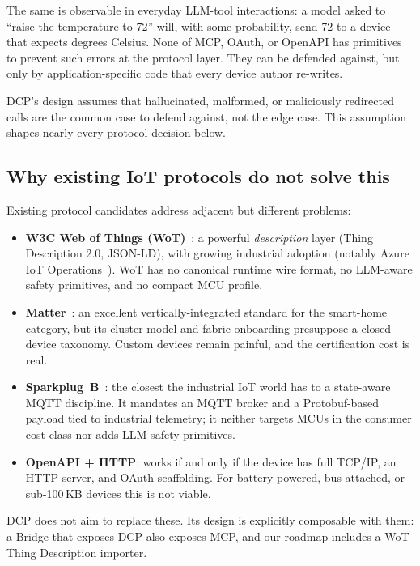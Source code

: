 \documentclass[11pt,a4paper]{article}
\begin{document}
The same is observable in everyday LLM-tool interactions: a model asked to
``raise the temperature to 72'' will, with some probability, send 72 to a
device that expects degrees Celsius. None of MCP, OAuth, or OpenAPI has
primitives to prevent such errors at the protocol layer. They can be
defended against, but only by application-specific code that every device
author re-writes.

DCP's design assumes that hallucinated, malformed, or maliciously
redirected calls are the common case to defend against, not the edge case.
This assumption shapes nearly every protocol decision below.

\subsection{Why existing IoT protocols do not solve this}

Existing protocol candidates address adjacent but different problems:

\begin{itemize}[leftmargin=*,nosep]
  \item \textbf{W3C Web of Things (WoT)}~\cite{wot_td_2025}: a powerful
        \emph{description} layer (Thing Description 2.0, JSON-LD), with
        growing industrial adoption (notably Azure IoT
        Operations~\cite{azure_wot_2025}). WoT has no canonical runtime wire
        format, no LLM-aware safety primitives, and no compact MCU profile.
  \item \textbf{Matter}~\cite{matter_spec}: an excellent vertically-integrated
        standard for the smart-home category, but its cluster model and
        fabric onboarding presuppose a closed device taxonomy. Custom
        devices remain painful, and the certification cost is real.
  \item \textbf{Sparkplug~B}~\cite{sparkplug}: the closest the industrial IoT
        world has to a state-aware MQTT discipline. It mandates an MQTT
        broker and a Protobuf-based payload tied to industrial telemetry;
        it neither targets MCUs in the consumer cost class nor adds LLM
        safety primitives.
  \item \textbf{OpenAPI + HTTP}: works if and only if the device has full
        TCP/IP, an HTTP server, and OAuth scaffolding. For battery-powered,
        bus-attached, or sub-100\,KB devices this is not viable.
\end{itemize}

DCP does not aim to replace these. Its design is explicitly composable with
them: a Bridge that exposes DCP also exposes MCP, and our roadmap includes
a WoT Thing Description importer.
\end{document}
